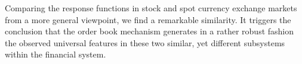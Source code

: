 Comparing the response functions in stock and spot currency exchange markets
from a more general viewpoint, we find a remarkable similarity. It triggers the
conclusion that the order book mechanism generates in a rather robust fashion
the observed universal features in these two similar, yet different subsystems
within the financial system.